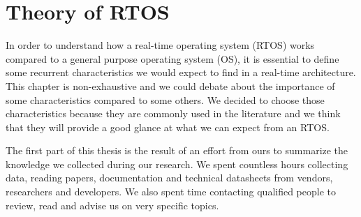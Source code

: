 \chapter{Theory of RTOS\label{part:rtos-theory}}

In order to understand how a real-time operating system (RTOS) works compared to a general purpose operating system (OS),
    it is essential to define some recurrent characteristics we would expect to find in a real-time architecture.
\\
This chapter is non-exhaustive and we could debate about the importance of some characteristics compared to some others.
We decided to choose those characteristics because they are commonly used in the literature
    and we think that they will provide a good glance at what we can expect from an RTOS.

The first part of this thesis is the result of an effort from ours to summarize the knowledge we collected during our research.
We spent countless hours collecting data, reading papers, documentation and technical datasheets from vendors, researchers and developers.
We also spent time contacting qualified people to review, read and advise us on very specific topics.










